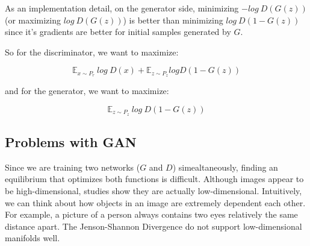 As an implementation detail, on the generator side, minimizing $-log~D(G(z))$ (or maximizing $log~D(G(z))$) is better than minimizing $log~D(1-G(z))$ since it's gradients are better for initial samples generated by $G$.

So for the discriminator, we want to maximize:

\begin{equation}
	\label{eq:maxD}
	\mathbb{E}_{x \sim P_r}~log~D(x) + \mathbb{E}_{z \sim P_z} log D(1-G(z))
\end{equation}

and for the generator, we want to maximize:

\begin{equation}
	\label{eq:maxG}
	\mathbb{E}_{z \sim P_z}~log~D(1-G(z))
\end{equation}

\subsection{Problems with GAN}
Since we are training two networks ($G$ and $D$) simealtaneously, finding an equilibrium that optimizes both functions is difficult. Although images appear to be high-dimensional, studies show they are actually low-dimensional. Intuitively, we can think about how objects in an image are extremely dependent each other. For example, a picture of a person always contains two eyes relatively the same distance apart. The Jenson-Shannon Divergence do not support low-dimensional manifolds well. 
